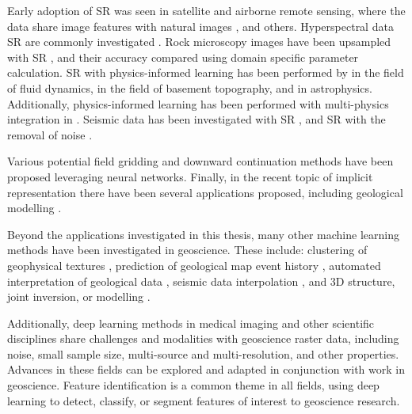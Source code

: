 Early adoption of SR was seen in satellite and airborne remote sensing, where the data share image features with natural images \parencite{lanarasSuperresolutionSentinel2Images2018,arunConvolutionalNetworkArchitectures2019,kawulokTrainingDeepNetworks2019}, and others.
Hyperspectral data SR are commonly investigated \parencite{yangHyperspectralImageClassification2018,arunCNNBasedSuperResolutionHyperspectral2020}.
Rock microscopy images have been upsampled with SR \parencite{niuInnovativeApplicationGenerative2020}, and their accuracy compared using domain specific parameter calculation.
SR with physics-informed learning has been performed by \textcite{bodeUsingPhysicsinformedEnhanced2021,jiangMeshfreeFlowNetPhysicsconstrainedDeep2020} in the field of fluid dynamics, \textcite{leongDeepBedMapDeepNeural2020} in the field of basement topography, and \textcite{jungbluthSingleframeSuperresolutionSolar2019} in astrophysics.
Additionally, physics-informed learning has been performed with multi-physics integration in \textcite{degen3DMultiphysicsUncertainty2022}.
Seismic data has been investigated with SR \parencite{liSuperresolutionSeismicVelocity2021}, and SR with the removal of noise \parencite{liDeepLearningSimultaneous2021}.

Various potential field gridding \parencite{naprstekNewMethodInterpolating2019, wangDeepLearningGravity2019a} and downward continuation methods \parencite{liStableDownwardContinuation2023,yeHighprecisionDownwardContinuation2022} have been proposed leveraging neural networks.
Finally, in the recent topic of implicit representation there have been several applications proposed, including geological modelling \parencite{hillierGeoINRImplicitNeural2023}.

Beyond the applications investigated in this thesis, many other machine learning methods have been investigated in geoscience.
These include: clustering of geophysical textures \parencite{grujicGeophysicsNeuralNetworks2019}, prediction of geological map event history \parencite{guo3DGeologicalStructure2021}, automated interpretation of geological data \parencite{waldelandConvolutionalNeuralNetworks2018, babakhinSemisupervisedSegmentationSalt2019,dawsonImpactDatasetSize2023}, seismic data interpolation \parencite{wangDeeplearningbasedSeismicData2018}, and 3D structure, joint inversion, or modelling \parencite{guo3DGeologicalStructure2021}.

Additionally, deep learning methods in medical imaging and other scientific disciplines share challenges and modalities with geoscience raster data, including noise, small sample size, multi-source and multi-resolution, and other properties.
Advances in these fields can be explored and adapted in conjunction with work in geoscience.
Feature identification is a common theme in all fields, using deep learning to detect, classify, or segment features of interest to geoscience research.

